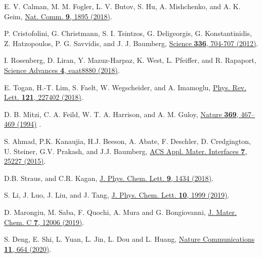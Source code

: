 \documentclass[prb,twocolumn,preprintnumbers,superscriptaddress]{revtex4}
\begin{document}
\begin{thebibliography}{99}
E. V. Calman, M. M. Fogler, L. V. Butov, S. Hu, A. Mishchenko, and A. K. Geim, 
\href{https://www.nature.com/articles/s41467-018-04293-7}{ Nat. Comm. {\bf 9}, 1895 (2018)}.

P. Cristofolini, G. Christmann, S. I. Tsintzos, G. Deligeorgis, G.  Konstantinidis, Z. Hatzopoulos, P. G. Savvidis, and J. J. Baumberg,
\href{https://www.science.org/doi/10.1126/science.1219010}{Science {\bf 336}, 704-707 (2012)}.

I. Rosenberg, D. Liran, Y. Mazuz-Harpaz, K. West, L. Pfeiffer, and R. Rapaport,
\href{https://www.science.org/doi/10.1126/sciadv.aat8880}{Science Advances {\bf 4},  eaat8880 (2018)}.

E. Togan, H.-T. Lim, S. Faelt, W. Wegscheider, and A. Imamoglu,
\href{https://journals.aps.org/prl/abstract/10.1103/PhysRevLett.121.227402}{Phys. Rev. Lett. {\bf 121}, 227402 (2018)}.


D. B. Mitzi, C. A. Feild, W. T. A. Harrison, and A. M. Guloy, 
\href{https://www.nature.com/articles/369467a0}{Nature {\bf 369}, 467–469 (1994)} .

 S. Ahmad, P.K. Kanaujia, H.J. Beeson, A. Abate, F. Deschler, D. Credgington, U. Steiner, G.V. Prakash, and J.J. Baumberg, 
\href{https://pubs.acs.org/doi/10.1021/acsami.5b07026}{ACS Appl. Mater. Interfaces {\bf 7}, 25227 (2015)}.

 D.B. Straus, and C.R. Kagan,
\href{https://pubs.acs.org/doi/10.1021/acs.jpclett.8b00201}{J. Phys. Chem. Lett. {\bf 9}, 1434 (2018)}.

 S. Li, J. Luo, J. Liu, and J. Tang, 
\href{https://pubs.acs.org/doi/abs/10.1021/acs.jpclett.8b03604}{J. Phys. Chem. Lett. {\bf 10}, 1999 (2019)}.

 D. Marongiu, M. Saba, F. Quochi, A. Mura and G. Bongiovanni, 
\href{https://pubs.rsc.org/en/content/articlelanding/2019/tc/c9tc04292j}{J. Mater. Chem. C {\bf 7}, 12006 (2019)}.

 S. Deng, E. Shi, L. Yuan, L. Jin, L. Dou and L. Huang, 
\href{https://www.nature.com/articles/s41467-020-14403-z}{Nature Communications {\bf 11}, 664 (2020)}.


\end{thebibliography}
\end{document}
